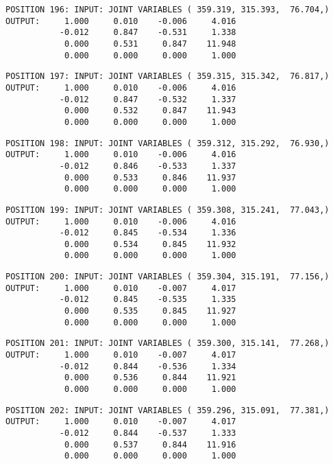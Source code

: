 \begin{verbatim}
POSITION 196: INPUT: JOINT VARIABLES ( 359.319, 315.393,  76.704,)
OUTPUT:     1.000     0.010    -0.006     4.016
           -0.012     0.847    -0.531     1.338
            0.000     0.531     0.847    11.948
            0.000     0.000     0.000     1.000
\end{verbatim} \pagebreak[1]\begin{verbatim}
POSITION 197: INPUT: JOINT VARIABLES ( 359.315, 315.342,  76.817,)
OUTPUT:     1.000     0.010    -0.006     4.016
           -0.012     0.847    -0.532     1.337
            0.000     0.532     0.847    11.943
            0.000     0.000     0.000     1.000
\end{verbatim} \pagebreak[1]\begin{verbatim}
POSITION 198: INPUT: JOINT VARIABLES ( 359.312, 315.292,  76.930,)
OUTPUT:     1.000     0.010    -0.006     4.016
           -0.012     0.846    -0.533     1.337
            0.000     0.533     0.846    11.937
            0.000     0.000     0.000     1.000
\end{verbatim} \pagebreak[1]\begin{verbatim}
POSITION 199: INPUT: JOINT VARIABLES ( 359.308, 315.241,  77.043,)
OUTPUT:     1.000     0.010    -0.006     4.016
           -0.012     0.845    -0.534     1.336
            0.000     0.534     0.845    11.932
            0.000     0.000     0.000     1.000
\end{verbatim} \pagebreak[1]\begin{verbatim}
POSITION 200: INPUT: JOINT VARIABLES ( 359.304, 315.191,  77.156,)
OUTPUT:     1.000     0.010    -0.007     4.017
           -0.012     0.845    -0.535     1.335
            0.000     0.535     0.845    11.927
            0.000     0.000     0.000     1.000
\end{verbatim} \pagebreak[1]\begin{verbatim}
POSITION 201: INPUT: JOINT VARIABLES ( 359.300, 315.141,  77.268,)
OUTPUT:     1.000     0.010    -0.007     4.017
           -0.012     0.844    -0.536     1.334
            0.000     0.536     0.844    11.921
            0.000     0.000     0.000     1.000
\end{verbatim} \pagebreak[1]\begin{verbatim}
POSITION 202: INPUT: JOINT VARIABLES ( 359.296, 315.091,  77.381,)
OUTPUT:     1.000     0.010    -0.007     4.017
           -0.012     0.844    -0.537     1.333
            0.000     0.537     0.844    11.916
            0.000     0.000     0.000     1.000
\end{verbatim} \pagebreak[1]\begin{verbatim}

\end{verbatim}
